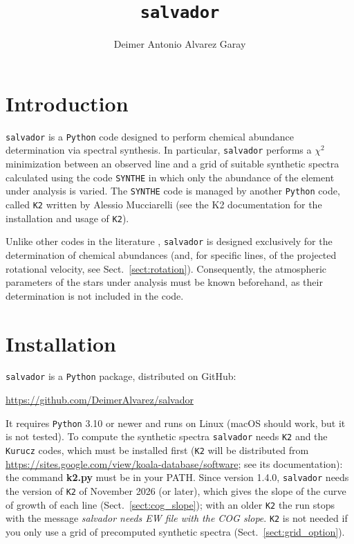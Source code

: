 \documentclass[modern]{aastex701}
\begin{document}
\title{\texttt{salvador}}


\author[orcid=0000-0002-9156-0729]{Deimer Antonio Alvarez Garay}
\email[show]{\textcolor{magenta}{deimer.alvarez@inaf.it}}  




\section{Introduction} 
\hrulefill

\texttt{salvador} is a \texttt{Python} code designed to perform chemical abundance determination via spectral synthesis. In particular, \texttt{salvador} performs a $\chi^2$ minimization between an observed line and a grid of suitable synthetic spectra calculated using the code \texttt{SYNTHE} \citep{kurucz_05} in which only the abundance of the element under analysis is varied. The \texttt{SYNTHE} code is managed by another \texttt{Python} code, called \texttt{K2} written by Alessio Mucciarelli (see the K2 documentation for the installation and usage of \texttt{K2}). 

Unlike other codes in the literature \citep[e.g.;][]{magrini_13,sbordone_14,blanco_cuaresma_14}, \texttt{salvador} is designed exclusively for the determination of chemical abundances (and, for specific lines, of the projected rotational velocity, see Sect.~\ref{sect:rotation}). Consequently, the atmospheric parameters of the stars under analysis must be known beforehand, as their determination is not included in the code.


\section{Installation}
\hrulefill

\texttt{salvador} is a \texttt{Python} package, distributed on GitHub:
\begin{center}
    \url{https://github.com/DeimerAlvarez/salvador}
\end{center}
It requires \texttt{Python} 3.10 or newer and runs on Linux (macOS should work, but it is not tested). To compute the synthetic spectra \texttt{salvador} needs \texttt{K2} and the \texttt{Kurucz} codes, which must be installed first (\texttt{K2} will be distributed from \url{https://sites.google.com/view/koala-database/software}; see its documentation): the command {\bf k2.py} must be in your PATH. Since version 1.4.0, \texttt{salvador} needs the version of \texttt{K2} of November 2026 (or later), which gives the slope of the curve of growth of each line (Sect.~\ref{sect:cog_slope}); with an older \texttt{K2} the run stops with the message {\it salvador needs EW file with the COG slope}. \texttt{K2} is not needed if you only use a grid of precomputed synthetic spectra (Sect.~\ref{sect:grid_option}).
\end{document}
